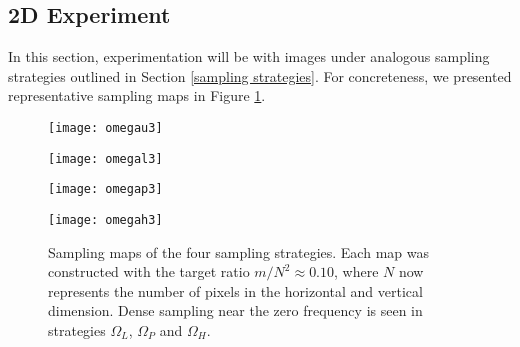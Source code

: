 \documentclass[11pt, oneside]{article}   %
\begin{document}
\subsection{2D Experiment}
In this section, experimentation will be with images under analogous sampling strategies outlined in Section \ref{sampling strategies}. For concreteness, we presented representative sampling maps in Figure \ref{sampling maps 2}.

\begin{figure}
        \centering
\begin{minipage}{.45\textwidth}
     \texttt{[image: omegau3]}
\end{minipage}
\begin{minipage}{.45\textwidth}
      \texttt{[image: omegal3]}
\end{minipage}
\begin{minipage}{.45\textwidth}
     \texttt{[image: omegap3]}
\end{minipage}
\begin{minipage}{.45\textwidth}
      \texttt{[image: omegah3]}
\end{minipage}
\caption{Sampling maps of the four sampling strategies. Each map was constructed with the target ratio $m/N^2 \approx 0.10$, where $N$ now represents the number of pixels in the horizontal and vertical dimension. Dense sampling near the zero frequency is seen in strategies $\Omega_L$, $\Omega_P$ and $\Omega_H$. }
\label{sampling maps 2}
\end{figure}
\end{document}
